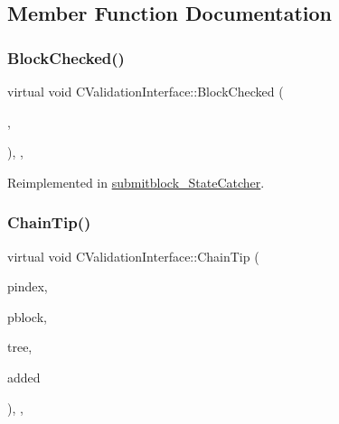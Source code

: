 \subsection{Member Function Documentation}
\mbox{\label{class_c_validation_interface_aeb34ef6814685cabc29062ed7be25441}} 
\subsubsection{\texorpdfstring{Block\+Checked()}{BlockChecked()}}
{\footnotesize\ttfamily virtual void C\+Validation\+Interface\+::\+Block\+Checked (\begin{DoxyParamCaption}\item[{const C\+Block \&}]{,  }\item[{const C\+Validation\+State \&}]{ }\end{DoxyParamCaption})\hspace{0.3cm}{\ttfamily [inline]}, {\ttfamily [protected]}, {\ttfamily [virtual]}}



Reimplemented in \mbox{\hyperlink{classsubmitblock___state_catcher_a7c7174ac1a54c80c572b115114aa2ee6}{submitblock\+\_\+\+State\+Catcher}}.

\mbox{\label{class_c_validation_interface_a15a2ed92f499a9b54c75a594eb0a7702}} 
\subsubsection{\texorpdfstring{Chain\+Tip()}{ChainTip()}}
{\footnotesize\ttfamily virtual void C\+Validation\+Interface\+::\+Chain\+Tip (\begin{DoxyParamCaption}\item[{const \mbox{\hyperlink{class_c_block_index}{C\+Block\+Index}} $\ast$}]{pindex,  }\item[{const C\+Block $\ast$}]{pblock,  }\item[{Z\+C\+Incremental\+Merkle\+Tree}]{tree,  }\item[{bool}]{added }\end{DoxyParamCaption})\hspace{0.3cm}{\ttfamily [inline]}, {\ttfamily [protected]}, {\ttfamily [virtual]}}

